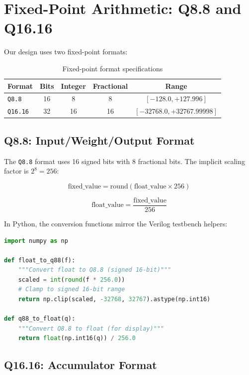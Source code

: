 \documentclass[11pt,a4paper]{report}
\newcommand{\qformat}[1]{\texttt{\color{accentcolor}#1}}
\begin{document}
\section{Fixed-Point Arithmetic: Q8.8 and Q16.16}

Our design uses two fixed-point formats:

\begin{table}[h]
\centering
\begin{tabular}{@{}lcccc@{}}
\toprule
\textbf{Format} & \textbf{Bits} & \textbf{Integer} & \textbf{Fractional} & \textbf{Range} \\
\midrule
\qformat{Q8.8}  & 16 & 8 & 8 & $[-128.0, +127.996]$ \\
\qformat{Q16.16} & 32 & 16 & 16 & $[-32768.0, +32767.99998]$ \\
\bottomrule
\end{tabular}
\caption{Fixed-point format specifications}
\end{table}

\subsection{Q8.8: Input/Weight/Output Format}

The \qformat{Q8.8} format uses 16 signed bits with 8 fractional bits. The implicit scaling factor is $2^8 = 256$:

$$
\text{fixed\_value} = \text{round}(\text{float\_value} \times 256)
$$

$$
\text{float\_value} = \frac{\text{fixed\_value}}{256}
$$

In Python, the conversion functions mirror the Verilog testbench helpers:

\begin{lstlisting}[language=Python, caption={Python Q8.8 conversion functions}]
import numpy as np

def float_to_q88(f):
    """Convert float to Q8.8 (signed 16-bit)"""
    scaled = int(round(f * 256.0))
    # Clamp to signed 16-bit range
    return np.clip(scaled, -32768, 32767).astype(np.int16)

def q88_to_float(q):
    """Convert Q8.8 to float (for display)"""
    return float(np.int16(q)) / 256.0
\end{lstlisting}

\subsection{Q16.16: Accumulator Format}
\end{document}
